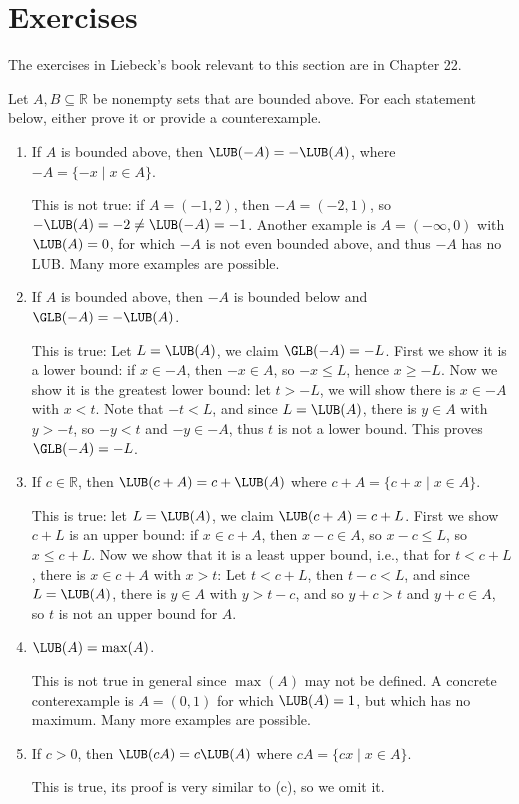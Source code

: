 \documentclass[11pt,dvipsnames]{book}
\numberwithin{figure}{section} %
\numberwithin{table}{section} %
\begin{document}

\section{Exercises}

The exercises in Liebeck's book relevant to this section are in Chapter 22.

\begin{exercise}
Let $A,B\subseteq \mathbb{R}$ be nonempty sets that are bounded above. For each statement below, either prove it or provide a counterexample.
\begin{enumerate}[label=(\alph*)]
\item If $A$ is bounded above, then $\LUB(-A)=-\LUB(A)$, where $-A=\{-x \; | \; x\in A\}$.
\begin{solution}
This is not true: if $A=(-1,2)$, then $-A=(-2,1)$, so $-\LUB(A)=-2\neq \LUB(-A)=-1$. Another example is $A = (-\infty, 0)$ with $\LUB(A) = 0$, for which $-A$ is not even bounded above, and thus $-A$ has no LUB. Many more examples are possible.
\end{solution}
\item If $A$ is bounded above, then $-A$ is bounded below and $\GLB(-A)=-\LUB(A)$.
\begin{solution}
This is true: Let $L=\LUB(A)$, we claim $\GLB(-A)=-L$. First we show it is a lower bound: if $x\in -A$, then $-x\in A$, so $-x\leq L$, hence $x\geq -L$. Now we show it is the greatest lower bound: let $t>-L$, we will show there is $x\in -A$ with $x<t$. Note that $-t<L$, and since $L=\LUB(A)$, there is $y\in A$ with $y>-t$, so $-y<t$ and $-y\in -A$, thus $t$ is not a lower bound. This proves $\GLB(-A)=-L$.
\end{solution}
\item If $c\in \mathbb{R}$, then $\LUB(c+A)=c+\LUB(A)$ where $c+A=\{c+x \; | \; x\in A\}$.
\begin{solution}
This is true: let $L=\LUB(A)$, we claim $\LUB(c+A)=c+L$. First we show $c+L$ is an upper bound: if $x\in c+A$, then $x-c\in A$, so $x-c\leq L$, so $x\leq c+L$. Now we show that it is a least upper bound, i.e., that for $t<c+L$, there is $x\in c+A$ with $x>t$: Let $t<c+L$, then $t-c<L$, and since $L=\LUB(A)$, there is $y\in A$ with $y>t-c$, and so $y+c>t$ and $y+c\in A$, so $t$ is not an upper bound for $A$.
\end{solution}
\item $\LUB(A)=\max(A)$.
\begin{solution}
This is not true in general since $\max(A)$ may not be defined. A concrete conterexample is $A = (0,1)$ for which $\LUB(A) =1$, but which has no maximum. Many more examples are possible.
\end{solution}
\item If $c>0$, then $\LUB(cA)=c\LUB(A)$ where $cA=\{cx\; | \; x\in A\}$.
\begin{solution}
This is true, its proof is very similar to (c), so we omit it.
\end{solution}


\end{enumerate}
\end{exercise}
\end{document}
